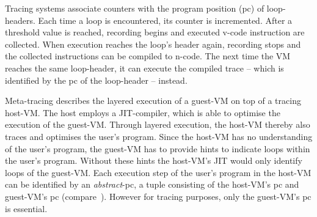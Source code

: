 Tracing systems associate counters with the program position (pc) of
loop-headers. Each time a loop is encountered, its counter is incremented. After
a threshold value is reached, recording begins and executed v-code instruction
are collected. When execution reaches the loop's header again, recording stops
and the collected instructions can be compiled to n-code. The next time
the VM reaches the same loop-header, it can execute the compiled trace -- which
is identified by the pc of the loop-header -- instead.

Meta-tracing describes the layered execution of a guest-VM on top of a tracing
host-VM. The host employs a JIT-compiler, which is able to optimise the
execution of the guest-VM. Through layered execution, the host-VM thereby also
traces and optimises the user's program. Since the host-VM has no understanding
of the user's program, the guest-VM has to provide hints to indicate loops
within the user's program. Without these hints the host-VM's JIT would only
identify loops of the guest-VM. Each execution step of the user's program in the
host-VM can be identified by an \emph{abstract}-pc, a tuple consisting of the
host-VM's pc and guest-VM's pc (compare~\cite{sullivan2003dynamic}). However for
tracing purposes, only the guest-VM's pc is essential.
















